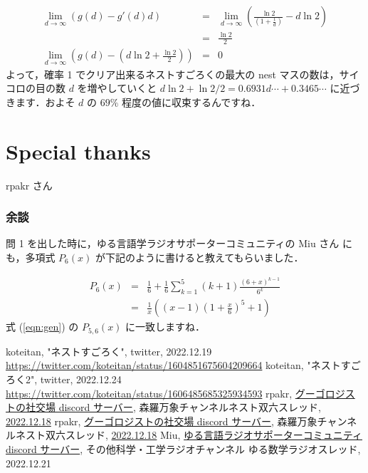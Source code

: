 \documentclass[a4j, 12pt]{jsarticle}
\renewcommand{\liminf}{\lim_{d\rightarrow\infty}}
\begin{document}
\begin{eqnarray}
  \liminf \left(g(d)-g'(d)d\right)&=&\liminf\left(\frac{\ln 2}{\left(1+\frac{1}{d}\right)}-d\ln 2\right)\\
                                  &=&\frac{\ln 2}{2}\\
  \liminf \left(g(d) - \left(d\ln 2 + \frac{\ln 2}{2}\right)\right) &=&0
\end{eqnarray}
よって，確率 1 でクリア出来るネストすごろくの最大の nest マスの数は，サイコロの目の数 $d$ を増やしていくと $d \ln2+\ln 2/2=0.6931d\cdots+0.3465\cdots$ に近づきます．およそ $d$ の $69 \%$ 程度の値に収束するんですね．

\section*{Special thanks}
rpakr さん

\subsubsection{余談}
問 1\cite{nestsugoroku} を出した時に，ゆる言語学ラジオサポーターコミュニティの Miu さん \cite{miu} にも，多項式 $P_6(x)$ が下記のように書けると教えてもらいました．

\begin{eqnarray}
P_6(x)&=&\frac{1}{6}+\frac{1}{6}\sum_{k=1}^5(k+1)\frac{(6+x)^{k-1}}{6^k}\\
      &=&\frac{1}{x}\left((x-1)\left(1+\frac{x}{6}\right)^5+1\right)
\end{eqnarray}
式 (\ref{eqn:gen}) の $P_{5,6}(x)$ に一致しますね．

\begin{thebibliography}{99}
 koteitan, "ネストすごろく", twitter, 2022.12.19 \url{https://twitter.com/koteitan/status/1604851675604209664}
 koteitan, "ネストすごろく2", twitter, 2022.12.24 \url{https://twitter.com/koteitan/status/1606485685325934593}
 rpakr, \href{https://discordapp.com/invite/3XK4tq6}{グーゴロジストの社交場 discord サーバー}, 森羅万象チャンネルネスト双六スレッド, \href{https://discord.com/channels/444127369033416704/1053714648727310336/1053948216791552100}{2022.12.18}
 rpakr, \href{https://discordapp.com/invite/3XK4tq6}{グーゴロジストの社交場 discord サーバー}, 森羅万象チャンネルネスト双六スレッド, \href{https://discord.com/channels/444127369033416704/1053714648727310336/1053952001911832586}{2022.12.18}
 Miu, \href{https://yurugengo.com/}{ゆる言語ラジオ}\href{https://yurugengo.com/support}{サポーターコミュニティ discord サーバー}, その他科学・工学ラジオチャンネル ゆる数学ラジオスレッド, 2022.12.21
\end{thebibliography}
 
\end{document}
